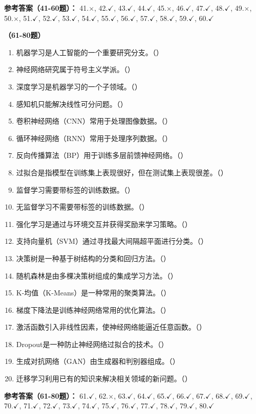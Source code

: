 \textbf{参考答案（41-60题）：}
41.$\times$, 42.$\checkmark$, 43.$\checkmark$, 44.$\checkmark$, 45.$\times$, 46.$\checkmark$, 47.$\checkmark$, 48.$\checkmark$, 49.$\times$, 50.$\times$, 
51.$\checkmark$, 52.$\checkmark$, 53.$\checkmark$, 54.$\checkmark$, 55.$\checkmark$, 56.$\checkmark$, 57.$\checkmark$, 58.$\checkmark$, 59.$\checkmark$, 60.$\checkmark$

\vspace{1em}
\textbf{（61-80题）}
\begin{enumerate}[resume,leftmargin=2em,itemsep=1pt]
\item 机器学习是人工智能的一个重要研究分支。（\quad）
\item 神经网络研究属于符号主义学派。（\quad）
\item 深度学习是机器学习的一个子领域。（\quad）
\item 感知机只能解决线性可分问题。（\quad）
\item 卷积神经网络（CNN）常用于处理图像数据。（\quad）
\item 循环神经网络（RNN）常用于处理序列数据。（\quad）
\item 反向传播算法（BP）用于训练多层前馈神经网络。（\quad）
\item 过拟合是指模型在训练集上表现很好，但在测试集上表现很差。（\quad）
\item 监督学习需要带标签的训练数据。（\quad）
\item 无监督学习不需要带标签的训练数据。（\quad）
\item 强化学习是通过与环境交互并获得奖励来学习策略。（\quad）
\item 支持向量机（SVM）通过寻找最大间隔超平面进行分类。（\quad）
\item 决策树是一种基于树结构的分类和回归方法。（\quad）
\item 随机森林是由多棵决策树组成的集成学习方法。（\quad）
\item K-均值（K-Means）是一种常用的聚类算法。（\quad）
\item 梯度下降法是训练神经网络常用的优化算法。（\quad）
\item 激活函数引入非线性因素，使神经网络能逼近任意函数。（\quad）
\item Dropout是一种防止神经网络过拟合的技术。（\quad）
\item 生成对抗网络（GAN）由生成器和判别器组成。（\quad）
\item 迁移学习利用已有的知识来解决相关领域的新问题。（\quad）
\end{enumerate}

\textbf{参考答案（61-80题）：}
61.$\checkmark$, 62.$\times$, 63.$\checkmark$, 64.$\checkmark$, 65.$\checkmark$, 66.$\checkmark$, 67.$\checkmark$, 68.$\checkmark$, 69.$\checkmark$, 70.$\checkmark$, 
71.$\checkmark$, 72.$\checkmark$, 73.$\checkmark$, 74.$\checkmark$, 75.$\checkmark$, 76.$\checkmark$, 77.$\checkmark$, 78.$\checkmark$, 79.$\checkmark$, 80.$\checkmark$

